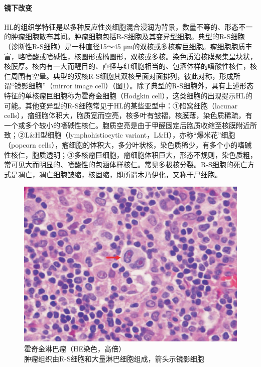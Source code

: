 \paragraph{镜下改变}
HL的组织学特征是以多种反应性炎细胞混合浸润为背景，数量不等的、形态不一的肿瘤细胞散布其间。肿瘤细胞包括R-S细胞及其变异型细胞。典型的R-S细胞（诊断性R-S细胞）是一种直径15～45
μm的双核或多核瘤巨细胞。瘤细胞胞质丰富，略嗜酸或嗜碱性，核圆形或椭圆形，双核或多核。染色质沿核膜聚集呈块状，核膜厚。核内有一大而醒目的、直径与红细胞相当的、包涵体样的嗜酸性核仁，核仁周围有空晕。典型的双核R-S细胞其双核呈面对面排列，彼此对称，形成所谓“镜影细胞”（mirror
image
cell）（图\ref{fig9-4}）。除了典型的R-S细胞外，具有上述形态特征的单核瘤巨细胞称为霍奇金细胞（Hodgkin
cell），这类细胞的出现提示HL的可能。其他变异型的R-S细胞常见于HL的某些亚型中：①陷窝细胞（lacunar
cells），瘤细胞体积大，胞质宽而空亮，核多叶有皱褶，核膜薄，染色质稀疏，有一个或多个较小的嗜碱性核仁。胞质空亮是由于甲醛固定后胞质收缩至核膜附近所致；②L\&H型细胞（lymphohistiocytic
variant，L\&H），亦称“爆米花”细胞（popcorn
cells），瘤细胞的体积大，多分叶状核，染色质稀少，有多个小的嗜碱性核仁，胞质透明；③多核瘤巨细胞，瘤细胞体积巨大，形态不规则，染色质粗，常可见大而明显的、嗜酸性的包涵体样核仁。常见多极核分裂。R-S细胞的死亡方式是凋亡，凋亡细胞皱缩，核固缩，即所谓木乃伊化，又称干尸细胞。

\begin{figure}[!htbp]
 \centering
 \includegraphics{./images/Image00145.jpg}
 \captionsetup{justification=centering}
 \caption{霍奇金淋巴瘤（HE染色，高倍）\\ {\small 肿瘤组织由R-S细胞和大量淋巴细胞组成，箭头示镜影细胞}}
\label{fig9-4}
  \end{figure}

